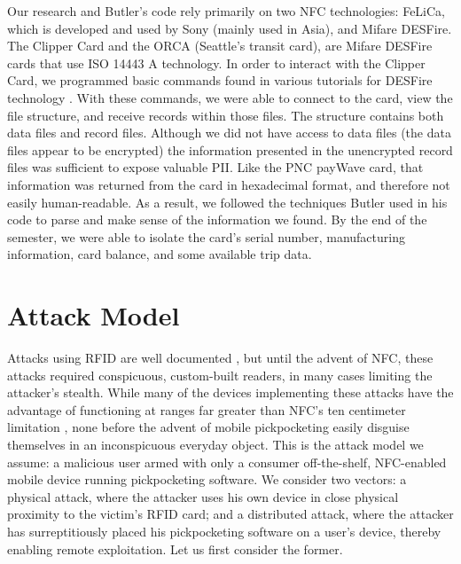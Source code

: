 \documentclass{sig-alternate}
\begin{document}
Our research and Butler's code rely primarily on two NFC technologies: FeLiCa, which is developed and used by Sony (mainly used in Asia), and Mifare DESFire. The Clipper Card and the ORCA (Seattle's transit card), are Mifare DESFire cards that use ISO 14443 A technology.  In order to interact with the Clipper Card, we programmed basic commands found in various tutorials for DESFire technology \cite{public-transport-card-exploits}.  With these commands, we were able to connect to the card, view the file structure, and receive records within those files.  The structure contains both data files and record files.  Although we did not have access to data files (the data files appear to be encrypted) the information presented in the unencrypted record files was sufficient to expose valuable PII.  Like the PNC payWave card, that information was returned from the card in hexadecimal format, and therefore not easily human-readable.  As a result, we followed the techniques Butler used in his code to parse and make sense of the information we found.  By the end of the semester, we were able to isolate the card's serial number, manufacturing information, card balance, and some available trip data.

\section{Attack Model}
Attacks using RFID are well documented \cite{picking-virtual-pockets} \cite{eavesdropping-attacks-hfrfid-tokens}, but until the advent of NFC, these attacks required conspicuous, custom-built readers, in many cases limiting the attacker's stealth.  While many of the devices implementing these attacks have the advantage of functioning at ranges far greater than NFC's ten centimeter limitation \cite{Kirschenbaum06howto}, none before the advent of mobile pickpocketing easily disguise themselves in an inconspicuous everyday object.  This is the attack model we assume:  a malicious user armed with only a consumer off-the-shelf, NFC-enabled mobile device running pickpocketing software.  We consider two vectors:  a physical attack, where the attacker uses his own device in close physical proximity to the victim's RFID card; and a distributed attack, where the attacker has surreptitiously placed his pickpocketing software on a user's device, thereby enabling remote exploitation.  Let us first consider the former.  
\end{document}
